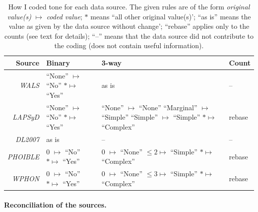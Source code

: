 \documentclass[twoside,twocolumn]{article}
\begin{document}
\begin{table}[h]
  \caption{How I coded tone for each data source. The given rules are of the form \textit{original value(s)}  $\mapsto$ \textit{coded value}; $\ast$ means ``all other original value(s)'; ``as is'' means the value as given by the data source without change'; ``rebase'' applies only to the counts (see text for details); ``--'' means that the data source did not contribute to the coding (does not contain useful information).}
  \label{Tab:tone_coding_rules}
  \centering
  \begin{tabularx}{\textwidth}{|r|X|X|X|}
    \toprule
    \textbf{Source} & \textbf{Binary} & \textbf{3-way} & \textbf{Count} \\
    \midrule
    \textit{WALS} & \makecell[l]{``None'' $\mapsto$ ``No''\\ $\ast \mapsto$ ``Yes''} & as is & -- \\
    \midrule
    \textit{LAPSyD} & \makecell[l]{``None'' $\mapsto$ ``No''\\ $\ast \mapsto$ ``Yes''} & \makecell[l]{``None'' $\mapsto$ ``None''\\``Marginal'' $\mapsto$ ``Simple''\\``Simple'' $\mapsto$ ``Simple''\\ $\ast \mapsto$ ``Complex''} & rebase \\
    \midrule
    \textit{DL2007} & as is & -- & -- \\
    \midrule
    \textit{PHOIBLE} & \makecell[l]{0 $\mapsto$ ``No''\\ $\ast \mapsto$ ``Yes''} & \makecell[l]{0 $\mapsto$ ``None''\\ $\leq 2 \mapsto$ ``Simple''\\ $\ast \mapsto$ ``Complex''} & rebase \\
    \midrule
    \textit{WPHON} & \makecell[l]{0 $\mapsto$ ``No''\\ $\ast \mapsto$ ``Yes''} & \makecell[l]{0 $\mapsto$ ``None''\\ $\leq 3 \mapsto$ ``Simple''\\ $\ast \mapsto$ ``Complex''} & rebase \\
    \bottomrule
  \end{tabularx}
\end{table}

\paragraph{Reconciliation of the sources.}
\end{document}
